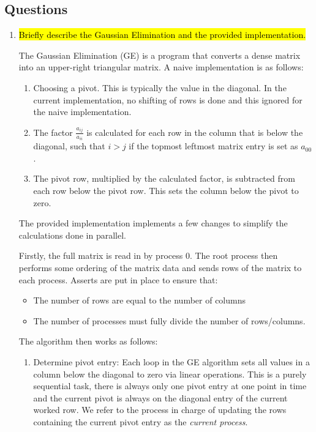 \subsection{Questions}
\begin{enumerate}
	\item \hl{Briefly describe the Gaussian Elimination and the provided implementation.}

	The Gaussian Elimination (GE) is a program that converts a dense matrix into an upper-right triangular matrix. A naive implementation is as follows:
\begin{enumerate}
	\item Choosing a pivot. This is typically the value in the diagonal. In the current implementation, no shifting of rows is done and this ignored for the naive implementation.
	\item The factor $\frac{a_{ij}}{a_{ii}}$ is calculated for each row in the column that is below the diagonal, such that $i > j$ if the topmost leftmost matrix entry is set as $a_{00}$.
	\item The pivot row, multiplied by the calculated factor, is subtracted from each row below the pivot row. This sets the column below the pivot to zero.
\end{enumerate}

The provided implementation implements a few changes to simplify the calculations done in parallel.

Firstly, the full matrix is read in by process 0. The root process then performs some ordering of the matrix data and sends rows of the matrix to each process. Asserts are put in place to ensure that:
\begin{itemize}
	\item The number of rows are equal to the number of columns
	\item The number of processes must fully divide the number of rows/columns.
\end{itemize}

The algorithm then works as follows:
\begin{enumerate}
\item Determine pivot entry: Each loop in the GE algorithm sets all values in a column below the diagonal to zero via linear operations. This is a purely sequential task, there is always only one pivot entry at one point in time and the current pivot is always on the diagonal entry of the current worked row. We refer to the process in charge of updating the rows containing the current pivot entry as the \textit{current process}. 


\end{enumerate}
\end{enumerate}
